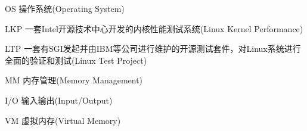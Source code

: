 
\begin{denotation}

\item[OS] 操作系统(Operating System)
\item[LKP] 一套Intel开源技术中心开发的内核性能测试系统(Linux Kernel Performance)
\item[LTP] 一套有SGI发起并由IBM等公司进行维护的开源测试套件，对Linux系统进行全面的验证和测试(Linux Test Project)
\item[MM] 内存管理(Memory Management)
\item[I/O] 输入输出(Input/Output)
\item[VM] 虚拟内存(Virtual Memory)


\end{denotation}